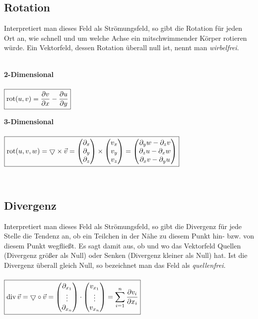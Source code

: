 \subsection{Rotation}
Interpretiert man dieses Feld als Strömungsfeld, so gibt die Rotation für jeden
Ort an, wie schnell und um welche Achse ein mitschwimmender Körper rotieren
würde. Ein Vektorfeld, dessen Rotation überall null ist, nennt man
\textit{wirbelfrei}.\\\\
\begin{minipage}{8cm}
	\textbf{2-Dimensional}\\\\
	$\boxed{\operatorname{rot}(u,v)=\frac{\partial v}{\partial x}-\frac{\partial u}{\partial y}}$
\end{minipage}
\begin{minipage}{8cm}
	\textbf{3-Dimensional}\\\\
	$\boxed{\operatorname{rot}(u,v,w)=\bigtriangledown\times
	\vec{v}=
	\begin{pmatrix}
    	\partial_x\\
    	\partial_y\\
    	\partial_z
    \end{pmatrix}\times
	\begin{pmatrix}
    	v_x\\
    	v_y\\
    	v_z
    \end{pmatrix}=
	\begin{pmatrix}
    	\partial_{y} w-\partial_{z} v\\
    	\partial_{z} u-\partial_{x} w\\
    	\partial_{x} v-\partial_{y} u
    \end{pmatrix}}$
\end{minipage} \\

\subsection{Divergenz}
Interpretiert man dieses Feld als Strömungsfeld, so gibt die Divergenz für jede
Stelle die Tendenz an, ob ein Teilchen in der Nähe zu diesem Punkt hin- bzw.
von diesem Punkt wegfließt. Es sagt damit aus, ob und wo das Vektorfeld Quellen
(Divergenz größer als Null) oder Senken (Divergenz kleiner als Null) hat. Ist
die Divergenz überall gleich Null, so bezeichnet man das Feld als
\textit{quellenfrei}.\\\\
$\boxed{\operatorname{div} \vec{v}=\bigtriangledown\circ \vec{v}=
	\begin{pmatrix}
    	\partial_{x_1}\\
    	\vdots\\
    	\partial_{x_n}
    \end{pmatrix}\cdot
	\begin{pmatrix}
    	v_{x_1}\\
    	\vdots\\
    	v_{x_n}
    \end{pmatrix}=
\sum\limits_{i=1}^n \frac{\partial v_i}{\partial x_i}}$

